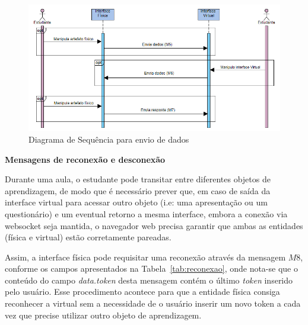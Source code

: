 \begin{figure}[htb]
	\centering
	\includegraphics[width=0.9\linewidth]{chapters/proposedMethod/msg_dadosv2.png}
	\caption{Diagrama de Sequência para envio de dados}
	\label{fig:diagrama-dados}
\end{figure}


\textbf{Mensagens de reconexão e desconexão}

Durante uma aula, o estudante pode transitar entre diferentes objetos de aprendizagem, de modo que é necessário prever que, em caso de saída da interface virtual para acessar outro objeto (i.e: uma apresentação ou um questionário) e um eventual retorno a mesma interface, embora a conexão via websocket seja mantida, o navegador web precisa garantir que ambas as entidades (física e virtual) estão corretamente pareadas. 

Assim, a interface física pode requisitar uma reconexão através da mensagem $M8$, conforme os campos apresentados na Tabela~\ref{tab:reconexao}, onde nota-se que o conteúdo do campo \textit{data.token} desta mensagem contém o último \textit{token} inserido pelo usuário. Esse procedimento acontece para que a entidade física consiga reconhecer a virtual sem a necessidade de o usuário inserir um novo token a cada vez que precise utilizar outro objeto de aprendizagem.

